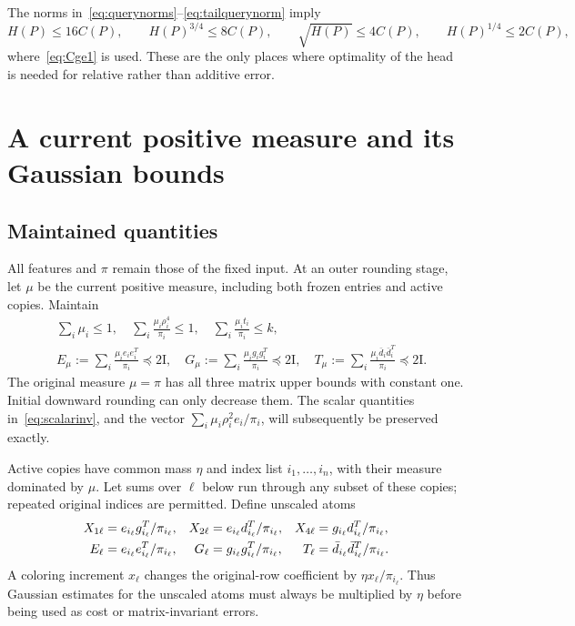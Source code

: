\documentclass[11pt]{article}
\theoremstyle{remark}\newtheorem{remark}[theorem]{Remark}
\newcommand{\Id}{\mathrm I}\newcommand{\dbar}{\bar d}
\numberwithin{equation}{section}
\begin{document}
The norms in~\eqref{eq:querynorms}--\eqref{eq:tailquerynorm} imply
\begin{equation}\label{eq:Cratios}
 H(P)\le16C(P),\qquad
 H(P)^{3/4}\le8C(P),\qquad
 \sqrt{H(P)}\le4C(P),\qquad H(P)^{1/4}\le2C(P),
\end{equation}
where~\eqref{eq:Cge1} is used. These are the only places where optimality of the head is needed for relative rather than additive error.

\section{A current positive measure and its Gaussian bounds}\label{sec:variance}
\subsection{Maintained quantities}
All features and $\pi$ remain those of the fixed input. At an outer rounding stage, let $\mu$ be the current positive measure, including both frozen entries and active copies. Maintain
\begin{align}
 &\sum_i\mu_i\le1,\quad
 \sum_i\frac{\mu_i\rho_i^4}{\pi_i}\le1,\quad
 \sum_i\frac{\mu_i t_i}{\pi_i}\le k,\label{eq:scalarinv}\\
 &E_\mu:=\sum_i\frac{\mu_i e_i e_i^T}{\pi_i}\preceq2\Id,
 \quad G_\mu:=\sum_i\frac{\mu_i g_i g_i^T}{\pi_i}\preceq2\Id,
 \quad T_\mu:=\sum_i\frac{\mu_i\dbar_i\dbar_i^T}{\pi_i}\preceq2\Id.\label{eq:matrixinv}
\end{align}
The original measure $\mu=\pi$ has all three matrix upper bounds with constant one. Initial downward rounding can only decrease them. The scalar quantities in~\eqref{eq:scalarinv}, and the vector $\sum_i\mu_i\rho_i^2e_i/\pi_i$, will subsequently be preserved exactly.

Active copies have common mass $\eta$ and index list $i_1,\ldots,i_n$, with their measure dominated by $\mu$. Let sums over $\ell$ below run through any subset of these copies; repeated original indices are permitted. Define unscaled atoms
\begin{align}
 X_{1\ell}&=e_{i_\ell}g_{i_\ell}^T/\pi_{i_\ell},&
 X_{2\ell}&=e_{i_\ell}d_{i_\ell}^T/\pi_{i_\ell},&
 X_{4\ell}&=g_{i_\ell}d_{i_\ell}^T/\pi_{i_\ell},\label{eq:copyatoms}\\
 E_\ell&=e_{i_\ell}e_{i_\ell}^T/\pi_{i_\ell},&
 G_\ell&=g_{i_\ell}g_{i_\ell}^T/\pi_{i_\ell},&
 T_\ell&=\dbar_{i_\ell}\dbar_{i_\ell}^T/\pi_{i_\ell}.\notag
\end{align}
A coloring increment $x_\ell$ changes the original-row coefficient by $\eta x_\ell/\pi_{i_\ell}$. Thus Gaussian estimates for the unscaled atoms must always be multiplied by $\eta$ before being used as cost or matrix-invariant errors.
\end{document}
